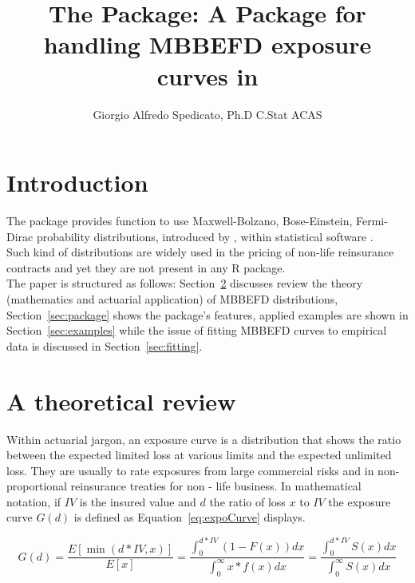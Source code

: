 \documentclass[nojss]{jss}
\author{Giorgio Alfredo Spedicato, Ph.D C.Stat ACAS}
\title{The \pkg{mbbefd} Package: A Package for handling MBBEFD exposure curves in \proglang{R}}
\begin{document}
\maketitle


\section{Introduction}

The  package provides function to use Maxwell-Bolzano, Bose-Einstein, Fermi-Dirac probability distributions, introduced by \citep{bernegger1997tile}, within  statistical software \citep{rSoftware}.\\ Such kind of distributions are widely used in the pricing of non-life reinsurance contracts and yet they are not present in any R package.\\

The paper is structured as follows: Section~\ref{sec:review} discusses review the theory (mathematics and actuarial application) of MBBEFD distributions, Section~\ref{sec:package} shows the package's features, applied examples are shown in Section~\ref{sec:examples} while the issue of fitting MBBEFD curves to empirical data is discussed in Section~\ref{sec:fitting}.\\



\section{A theoretical review}\label{sec:review}

Within actuarial jargon, an exposure curve is a distribution that shows the ratio between the expected limited loss at various limits and the expected unlimited loss. They are usually to rate exposures from large commercial risks and in non-proportional reinsurance treaties for non - life business. In mathematical notation, if $IV$ is the insured value and $d$ the ratio of loss $x$ to $IV$ the exposure curve $G\left( d \right)$ is defined as Equation~\ref{eq:expoCurve} displays.

\begin{equation}
G\left( d \right) = \frac{{E\left[ {\min \left( {d*IV,x} \right)} \right]}}{{E\left[ x \right]}} = \frac{{\int_0^{d*IV} {\left( {1 - F\left( x \right)} \right)dx} }}{{\int_0^\infty  {x*f\left( x \right)dx} }} = \frac{{\int_0^{d*IV} {S\left( x \right)dx} }}{{\int_0^\infty  {S\left( x \right)dx} }}
\label{eq:expoCurve}
\end{equation}
\end{document}
